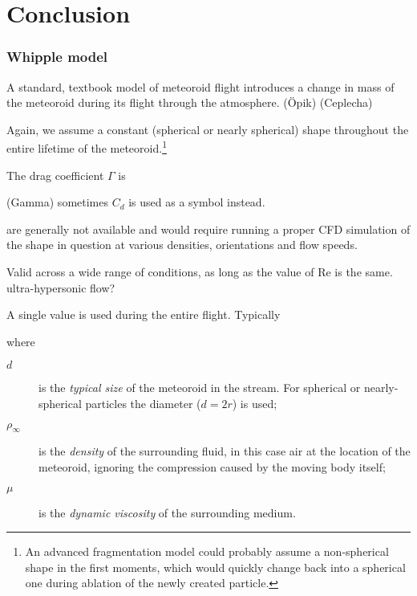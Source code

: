 \section{Conclusion} \label{dc}

    \subsubsection{Whipple model} \label{mmw}
        A standard, textbook model of meteoroid flight introduces a change in mass of the meteoroid
        during its flight through the atmosphere. 
        (Öpik) (Ceplecha)

        Again, we assume a constant (spherical or nearly spherical) shape throughout the entire
        lifetime of the meteoroid.\footnote{An advanced fragmentation model could probably assume a non-spherical
        shape in the first moments, which would quickly change back into a spherical one during ablation
        of the newly created particle.}

        The drag coefficient $\Gamma$ is 

        (Gamma) sometimes $C_d$ is used as a symbol instead.

        are generally not available and would require running a proper CFD simulation
        of the shape in question at various densities, orientations and flow speeds.

        Valid across a wide range of conditions, as long as the value of Re is the same.
        ultra-hypersonic flow?

        A single value is used during the entire flight. Typically


        where
        \begin{description}
            \item[$d$] is the \emph{typical size} of the meteoroid in the stream.
                For spherical or nearly-spherical particles the diameter ($d = 2r$) is used;
            \item[$\rho_\infty$] is the \emph{density} of the surrounding fluid, in this case
                air at the location of the meteoroid, ignoring the compression caused
                by the moving body itself;
            \item[$\mu$] is the \emph{dynamic viscosity} of the surrounding medium.
        \end{description}

